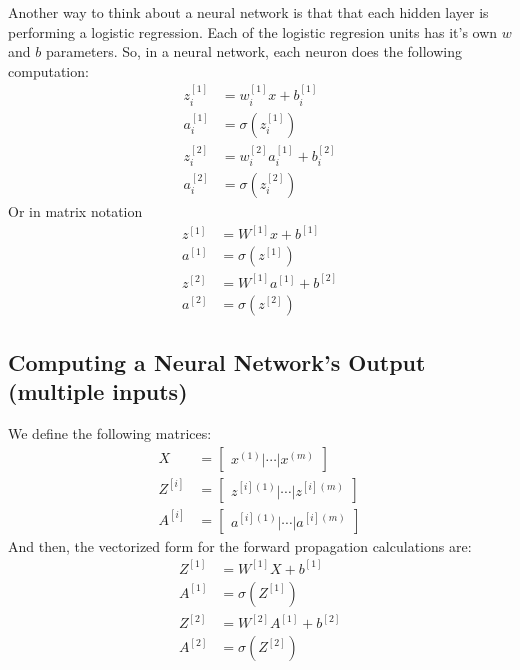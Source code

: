     Another way to think about a neural network is that that each hidden layer is 
    performing a logistic regression. Each of the logistic regresion units has it's own
    $w$ and $b$ parameters. So, in a neural network, each neuron does the 
    following computation:
    \begin{align*}
        z_i^{[1]} &= w_i^{[1]}x + b_i^{[1]} \\
        a_i^{[1]} &= \sigma(z_i^{[1]}) \\
        z_i^{[2]} &= w_i^{[2]}a_i^{[1]} + b_i^{[2]} \\
        a_i^{[2]} &= \sigma(z_i^{[2]})
    \end{align*}
    Or in matrix notation
    \begin{align*}
        z^{[1]} &= W^{[1]}x + b^{[1]} \\
        a^{[1]} &= \sigma(z^{[1]}) \\
        z^{[2]} &= W^{[1]}a^{[1]} + b^{[2]}  \\
        a^{[2]} &= \sigma(z^{[2]})
    \end{align*}

\subsection*{Computing a Neural Network's Output (multiple inputs)}

    We define the following matrices:
    \begin{align*}
        X &= \begin{bmatrix} x^{(1)} | \cdots | x^{(m)} \end{bmatrix} \\
        Z^{[i]} &= \begin{bmatrix} z^{[i](1)} | \cdots | z^{[i](m)} \end{bmatrix} \\
        A^{[i]} &= \begin{bmatrix} a^{[i](1)} | \cdots | a^{[i](m)} \end{bmatrix} 
    \end{align*}
    And then, the vectorized form for the forward propagation calculations are:
    \begin{align*}
        Z^{[1]} &= W^{[1]}X + b^{[1]} \\
        A^{[1]} &= \sigma(Z^{[1]}) \\
        Z^{[2]} &= W^{[2]}A^{[1]} + b^{[2]}  \\
        A^{[2]} &= \sigma(Z^{[2]})
    \end{align*}

